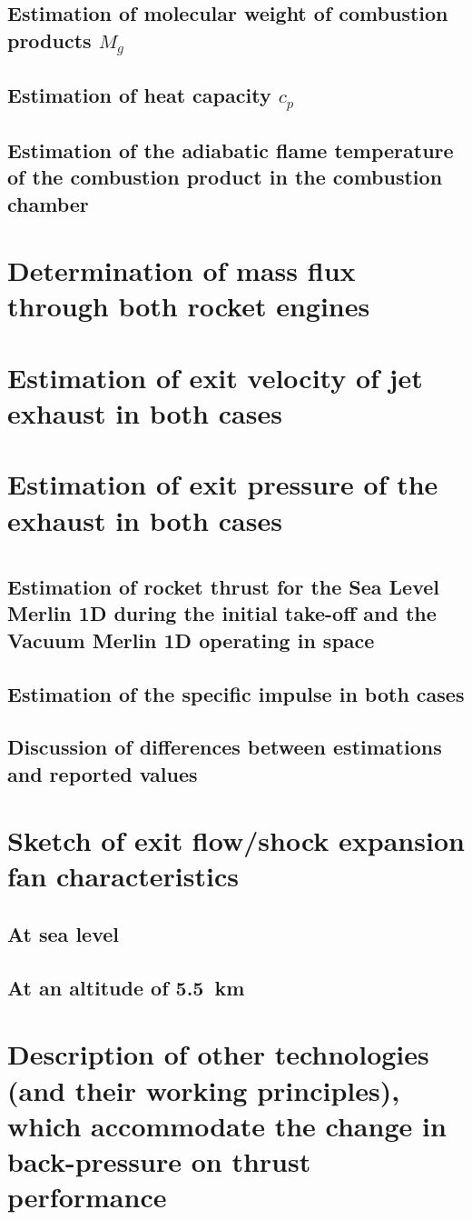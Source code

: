 \documentclass[11pt]{article}
\numberwithin{equation}{section}
\begin{document}
\subsection{Estimation of molecular weight of combustion products $M_g$}
\subsection{Estimation of heat capacity $c_p$}
\subsection{Estimation of the adiabatic flame temperature of the combustion product in the combustion chamber}
\section{Determination of mass flux through both rocket engines}
\section{Estimation of exit velocity of jet exhaust in both cases}
\section{Estimation of exit pressure of the exhaust in both cases}
\section{}
\subsection{Estimation of  rocket thrust for the Sea Level Merlin 1D during the initial take-off and the Vacuum Merlin 1D operating in space}
\subsection{Estimation of the specific impulse in both cases}
\subsection{Discussion of differences between estimations and reported values}
\section{Sketch of exit flow/shock expansion fan characteristics}
\subsection{At sea level}
\subsection{At an altitude of \SI{5.5}{\kilo\meter}}
\section{Description of other technologies (and their working principles), which accommodate the change in back-pressure on thrust performance}
\end{document}
